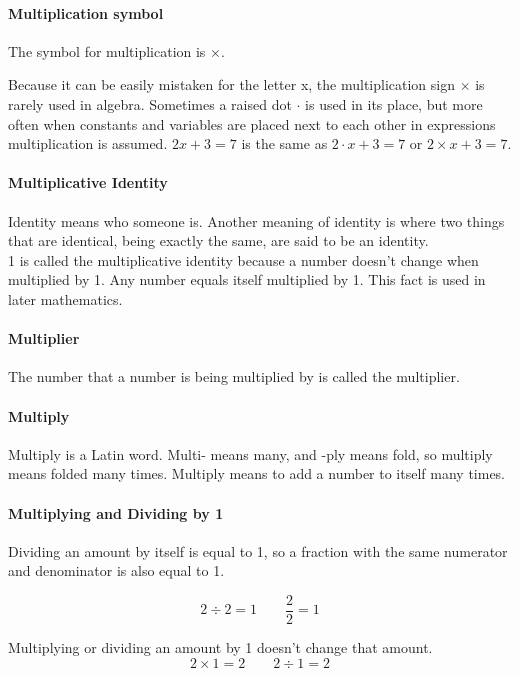 \documentclass[12pt]{article}
\begin{document}
{\paragraph{Multiplication symbol}
The symbol for multiplication is $\times$.

Because it can be easily mistaken for the letter x, the multiplication sign $\times$ is rarely used in algebra. Sometimes a raised dot $\cdot$ is used in its place, but more often when constants and variables are placed next to each other in expressions multiplication is assumed. \( 2x + 3 = 7 \) is the same as \( 2 \cdot x + 3 = 7 \) or \( 2 \times x + 3 = 7 \).

\paragraph{Multiplicative Identity}
Identity means who someone is. Another meaning of identity is where two things that are identical, being exactly the same, are said to be an identity.\\

1 is called the multiplicative identity because a number doesn’t change when multiplied by 1. Any number equals itself multiplied by 1. This fact is used in later mathematics.

\paragraph{Multiplier}
The number that a number is being multiplied by is called the multiplier.

\paragraph{Multiply}
Multiply is a Latin word. Multi- means many, and -ply means fold, so multiply means folded many times. Multiply means to add a number to itself many times.

\paragraph{Multiplying and Dividing by 1}
Dividing an amount by itself is equal to 1, so a fraction with the same numerator and denominator is also equal to 1.

$$2\div2=1 \hspace{2em} \frac{2}{2}=1$$
 
Multiplying or dividing an amount by 1 doesn't change that amount. 
$$2\times1=2 \hspace{2em} 2\div1=2$$

}
\end{document}
